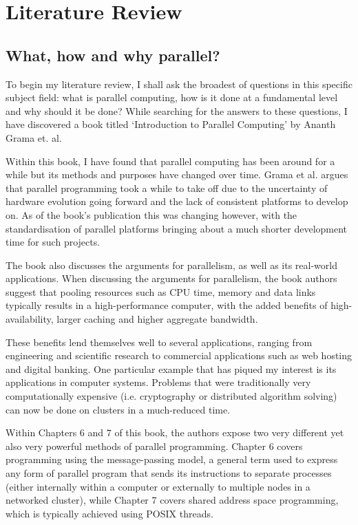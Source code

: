\cleardoublepage
{}
\chapter{Literature Review}
\section{What, how and why parallel?}
To begin my literature review, I shall ask the broadest of questions in this specific subject field: what is parallel computing, how is it done at a fundamental level and why should it be done? While searching for the answers to these questions, I have discovered a book titled ‘Introduction to Parallel Computing’ by Ananth Grama et. al. \cite{grama_et_al_2003}

Within this book, I have found that parallel computing has been around for a while but its methods and purposes have changed over time. Grama et al. argues that parallel programming took a while to take off due to the uncertainty of hardware evolution going forward and the lack of consistent platforms to develop on. As of the book's publication this was changing however, with the standardisation of parallel platforms bringing about a much shorter development time for such projects.

The book also discusses the arguments for parallelism, as well as its real-world applications. When discussing the arguments for parallelism, the book authors suggest that pooling resources such as CPU time, memory and data links typically results in a high-performance computer, with the added benefits of high-availability, larger caching and higher aggregate bandwidth.

These benefits lend themselves well to several applications, ranging from engineering and scientific research to commercial applications such as web hosting and digital banking. One particular example that has piqued my interest is its applications in computer systems. Problems that were traditionally very computationally expensive (i.e. cryptography or distributed algorithm solving) can now be done on clusters in a much-reduced time.

Within Chapters 6 and 7 of this book, the authors expose two very different yet also very powerful methods of parallel programming. Chapter 6 covers programming using the message-passing model, a general term used to express any form of parallel program that sends its instructions to separate processes (either internally within a computer or externally to multiple nodes in a networked cluster), while Chapter 7 covers shared address space programming, which is typically achieved using POSIX threads.

